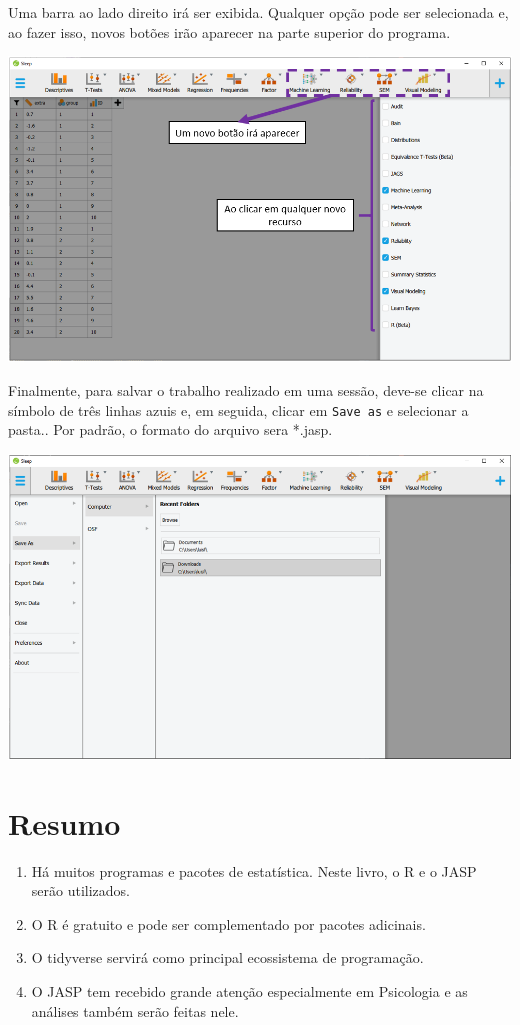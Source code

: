 \documentclass[
]{book}
\providecommand{\tightlist}{%
  \setlength{\itemsep}{0pt}\setlength{\parskip}{0pt}}
\begin{document}
Uma barra ao lado direito irá ser exibida. Qualquer opção pode ser selecionada e, ao fazer isso, novos botões irão aparecer na parte superior do programa.

\includegraphics{./img/cap_jasp_adicionar_modulos2.png}

Finalmente, para salvar o trabalho realizado em uma sessão, deve-se clicar na símbolo de três linhas azuis e, em seguida, clicar em \texttt{Save\ as} e selecionar a pasta.. Por padrão, o formato do arquivo sera *.jasp.

\includegraphics{./img/cap_jasp_salvar.png}

\hypertarget{resumo}{%
\section{Resumo}\label{resumo}}

\begin{enumerate}
\def\labelenumi{\arabic{enumi}.}
\tightlist
\item
  Há muitos programas e pacotes de estatística. Neste livro, o R e o JASP serão utilizados.\\
\item
  O R é gratuito e pode ser complementado por pacotes adicinais.\\
\item
  O tidyverse servirá como principal ecossistema de programação.\\
\item
  O JASP tem recebido grande atenção especialmente em Psicologia e as análises também serão feitas nele.\\
\end{enumerate}
\end{document}

